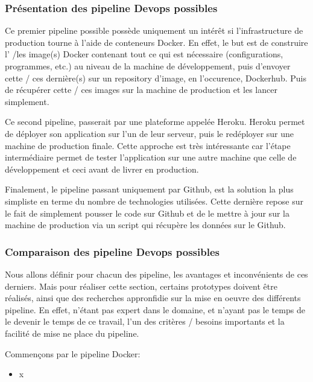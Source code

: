 \documentclass[
    iai, %
    il, %
]{heig-tb}
\begin{document}
\subsubsection{Présentation des pipeline Devops possibles}
Ce premier pipeline possible possède uniquement un intérêt si l'infrastructure de production tourne à l'aide de conteneurs Docker. En effet, le but est de construire l' /les image(s) Docker contenant tout ce qui est nécessaire (configurations, programmes, etc.) au niveau de la machine de développement, puis d'envoyer cette / ces dernière(s) sur un repository d'image, en l'occurence, Dockerhub. Puis de récupérer cette / ces images sur la machine de production et les lancer simplement.

Ce second pipeline, passerait par une plateforme appelée Heroku. Heroku permet de déployer son application sur l'un de leur serveur, puis le redéployer sur une machine de production finale.\newline
Cette approche est très intéressante car l'étape intermédiaire permet de tester l'application sur une autre machine que celle de développement et ceci avant de livrer en production.

Finalement, le pipeline passant uniquement par Github, est la solution la plus simpliste en terme du nombre de technologies utilisées. Cette dernière repose sur le fait de simplement pousser le code sur Github et de le mettre à jour sur la machine de production via un script qui récupère les données sur le Github.

\subsubsection{Comparaison des pipeline Devops possibles}
Nous allons définir pour chacun des pipeline, les avantages et inconvénients de ces derniers.
Mais pour réaliser cette section, certains prototypes doivent être réalisés, ainsi que des recherches appronfidie sur la mise en oeuvre des différents pipeline.\newline
En effet, n'étant pas expert dans le domaine, et n'ayant pas le temps de le devenir le temps de ce travail, l'un des critères / besoins importants et la facilité de mise ne place du pipeline.

Commençons par le pipeline Docker:
\begin{itemize}
    \item x
\end{itemize}
\end{document}
